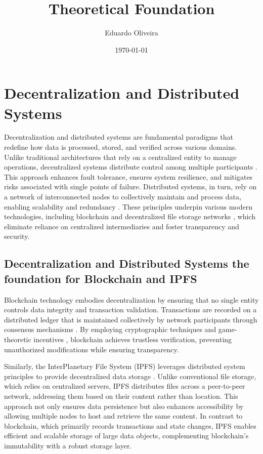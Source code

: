 \documentclass{article}
\title{Theoretical Foundation}
\author{Eduardo Oliveira}
\date{\today}
\begin{document}
\maketitle

\section{Decentralization and Distributed Systems}

Decentralization and distributed systems are fundamental paradigms that redefine how data is processed, stored, and verified across various domains. Unlike traditional architectures that rely on a centralized entity to manage operations, decentralized systems distribute control among multiple participants \cite{coulouris2011distributed}. This approach enhances fault tolerance, ensures system resilience, and mitigates risks associated with single points of failure. Distributed systems, in turn, rely on a network of interconnected nodes to collectively maintain and process data, enabling scalability and redundancy   \cite{lamport_1978, coulouris2011distributed}. These principles underpin various modern technologies, including blockchain \cite{nakamoto2008bitcoin} and decentralized file storage networks \cite{benet2014ipfs}, which eliminate reliance on centralized intermediaries and foster transparency and security.


\subsection{Decentralization and Distributed Systems the foundation for Blockchain and IPFS}

Blockchain technology embodies decentralization by ensuring that no single entity controls data integrity and transaction validation. Transactions are recorded on a distributed ledger that is maintained collectively by network participants through consensus mechanisms \cite{nakamoto2008bitcoin}. By employing cryptographic techniques \cite{katz2020introduction} and game-theoretic incentives \cite{roughgarden2016twentyone}, blockchain achieves trustless verification, preventing unauthorized modifications while ensuring transparency.

Similarly, the InterPlanetary File System (IPFS) leverages distributed system principles to provide decentralized data storage \cite{benet2014ipfs}. Unlike conventional file storage, which relies on centralized servers, IPFS distributes files across a peer-to-peer network, addressing them based on their content rather than location. This approach not only ensures data persistence but also enhances accessibility by allowing multiple nodes to host and retrieve the same content. In contrast to blockchain, which primarily records transactions and state changes, IPFS enables efficient and scalable storage of large data objects, complementing blockchain’s immutability with a robust storage layer.
\end{document}
